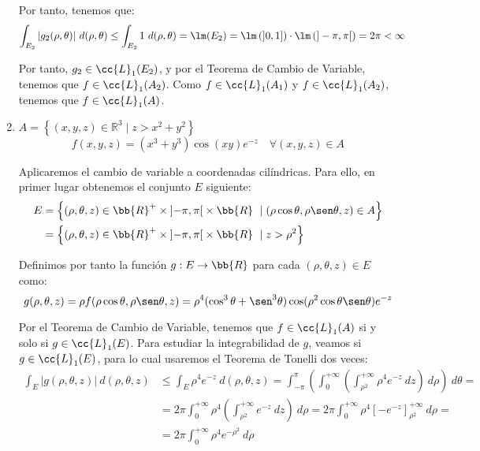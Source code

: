 \begin{ejercicio}
\begin{enumerate}
        Por tanto, tenemos que:
        \begin{align*}
            \int_{E_2} |g_2(\rho, \theta)|~d(\rho, \theta)
            &\leq \int_{E_2} 1~d(\rho, \theta)
            = \lm(E_2) = \lm\left(\left]0,1\right]\right) \cdot \lm\left(]-\pi, \pi[\right) = 2\pi < \infty
        \end{align*}

        Por tanto, $g_2\in \cc{L}_1(E_2)$, y por el Teorema de Cambio de Variable, tenemos que $f\in \cc{L}_1(A_2)$.
        Como $f\in \cc{L}_1(A_1)$ y $f\in \cc{L}_1(A_2)$, tenemos que $f\in \cc{L}_1(A)$.

        \item \( A = \left\{ (x, y, z) \in \mathbb{R}^3 \mid z > x^2 + y^2 \right\} \)
        \[ f(x, y, z) = (x^3 + y^3) \cos (xy) e^{-z} \quad \forall (x, y, z) \in A \]

        Aplicaremos el cambio de variable a coordenadas cilíndricas. Para ello, en primer
        lugar obtenemos el conjunto $E$ siguiente:
        \begin{align*}
            E &= \left\{ (\rho, \theta, z) \in \bb{R}^+\times \left]-\pi, \pi\right[ \times \bb{R} ~\mid (\rho\cos\theta, \rho\sen\theta, z) \in A \right\} \\
            &= \left\{ (\rho, \theta, z) \in \bb{R}^+\times \left]-\pi, \pi\right[ \times \bb{R} ~\mid z > \rho^2 \right\}
        \end{align*}

        Definimos por tanto la función $g: E \to \bb{R}$ para cada $(\rho, \theta, z) \in E$ como:
        \begin{equation*}
            g(\rho, \theta, z) = \rho f(\rho\cos\theta, \rho\sen\theta, z) = \rho^4(\cos^3\theta + \sen^3\theta) \cos(\rho^2\cos\theta\sen\theta)e^{-z}
        \end{equation*}

        Por el Teorema de Cambio de Variable, tenemos que $f\in \cc{L}_1(A)$ si y solo si $g\in \cc{L}_1(E)$. Para estudiar la integrabilidad de $g$, veamos si $g\in \cc{L}_1(E)$,
        para lo cual usaremos el Teorema de Tonelli dos veces:
        \begin{align*}
            \int_E |g(\rho, \theta, z)|~d(\rho, \theta, z)
            &\leq \int_E \rho^4e^{-z}~d(\rho, \theta, z)
            = \int_{-\pi}^\pi \left( \int_0^{+\infty} \left( \int_{\rho^2}^{+\infty} \rho^4e^{-z}~dz \right)~d\rho \right)~d\theta =\\
            &= 2\pi \int_0^{+\infty}\rho^4 \left( \int_{\rho^2}^{+\infty}e^{-z}~dz \right)~d\rho
            = 2\pi \int_0^{+\infty}\rho^4 \left[ -e^{-z} \right]_{\rho^2}^{+\infty}~d\rho =\\
            &= 2\pi \int_0^{+\infty}\rho^4e^{-\rho^2}~d\rho
        \end{align*}


\end{enumerate}
\end{ejercicio}

